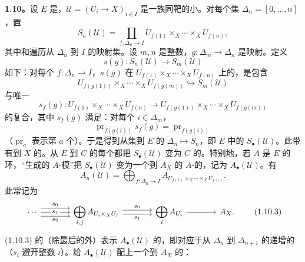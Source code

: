 \textbf{1.10。}设 $E$ 是，$\mathcal U=(U_i\to X)_{i\in I}$ 是一族同靶的小。对每个集 $\Delta_n=[0,\ldots,n]$，置
\[
 S_n(\mathcal U)=\coprod_{f:\Delta_n\to I}U_{f(1)}\times_X\cdots\times_XU_{f(n)},
\]
其中和遍历从 $\Delta_n$ 到 $I$ 的映射集。设 $m,n$ 是整数，$g:\Delta_m\to\Delta_n$ 是映射。定义
\[
 s(g):S_n(\mathcal U)\longrightarrow S_m(\mathcal U)\tag{1.10.1}
\]
如下：对每个 $f:\Delta_n\to I$，$s(g)$ 在 $U_{f(1)}\times_X\cdots\times_XU_{f(n)}$ 上的，是包含
\[
 U_{f(g(1))}\times_X\cdots\times_XU_{f(g(m))}\hookrightarrow S_m(\mathcal U)
\]
与唯一
\[
 s_f(g):U_{f(1)}\times_X\cdots\times_XU_{f(n)}
 \longrightarrow U_{f(g(1))}\times_X\cdots\times_XU_{f(g(m))}
\]
的复合，其中 $s_f(g)$ 满足：对每个 $i\in\Delta_m$，
\[
 \operatorname{pr}_{f(g(i))}s_f(g)=\operatorname{pr}_{f(g(i))}
\]
（$\operatorname{pr}_a$ 表示第 $a$ 个）。于是得到从集到 $E$ 的 $\Delta_n\mapsto S_n$，即 $E$ 中的 $S_\bullet(\mathcal U)$。此带有到 $X$ 的。从 $E$ 到 $C$ 的每个都把 $S_\bullet(\mathcal U)$ 变为 $C$ 的。特别地，若 $A$ 是 $E$ 的环，“生成的 $A$-模”把 $S_\bullet(\mathcal U)$ 变为一个到 $A_X$ 的 $A$-的，记为 $A_\bullet(\mathcal U)$。有
\[
 A_n(\mathcal U)=\bigoplus_{f:\Delta_n\to I}
 A_{U_{f(1)}\times_X\cdots\times_XU_{f(\square)} }.\tag{1.10.2}
\]
此常记为
\[
\begin{tikzcd}[column sep=large]
 \cdots\arrow[r,shift left=2,"s_0"]\arrow[r,"s_1" description]\arrow[r,shift right=2,"s_2"']&
 \displaystyle\bigoplus_{i,j}A_{U_i\times_XU_j}
 \arrow[r,shift left=1,"s_0"]\arrow[r,shift right=1,"s_1"']&
 \displaystyle\bigoplus_i A_{U_i}\arrow[r]&A_X.
\end{tikzcd}\tag{1.10.3}
\]
(1.10.3) 的（除最后的外）表示 $A_\bullet(\mathcal U)$ 的，即对应于从 $\Delta_n$ 到 $\Delta_{n+1}$ 的递增的（$s_i$ 避开整数 $i$）。给 $A_\bullet(\mathcal U)$ 配上一个到 $A_X$ 的：
